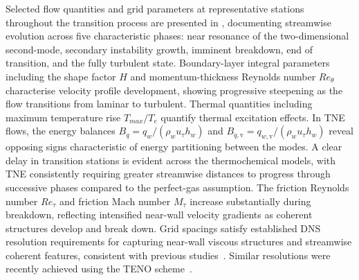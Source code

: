 Selected flow quantities and grid parameters at representative stations throughout the transition process are presented in , documenting streamwise evolution across five characteristic phases: near resonance of the two-dimensional second-mode, secondary instability growth, imminent breakdown, end of transition, and the fully turbulent state. Boundary-layer integral parameters including the shape factor $H$ and momentum-thickness Reynolds number $Re_\theta$ characterise velocity profile development, showing progressive steepening as the flow transitions from laminar to turbulent. Thermal quantities including maximum temperature rise $T_{max}/T_e$ quantify thermal excitation effects. In \gls{TNE} flows, the energy balances $B_q = q_w/(\rho_w u_\tau h_w)$ and $B_{q,\mathrm{v}} = q_{w,\mathrm{v}}/(\rho_w u_\tau h_w)$ reveal opposing signs characteristic of energy partitioning between the modes. A clear delay in transition stations is evident across the thermochemical models, with \gls{TNE} consistently requiring greater streamwise distances to progress through successive phases compared to the perfect-gas assumption. The friction Reynolds number $Re_\tau$ and friction Mach number $M_\tau$ increase substantially during breakdown, reflecting intensified near-wall velocity gradients as coherent structures develop and break down. Grid spacings satisfy established \gls{DNS} resolution requirements for capturing near-wall viscous structures and streamwise coherent features, consistent with previous studies~\citep{PoggieEtAl2015}. Similar resolutions were recently achieved using the TENO scheme~\citep{Williamsetal2025}.

